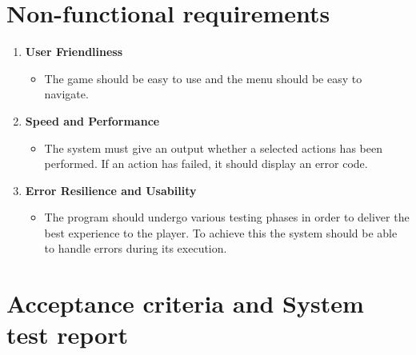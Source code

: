 \documentclass{article}
\begin{document}
\section{Non-functional requirements}

\begin{enumerate}
      \item \textbf{User Friendliness}
\begin{itemize}
    \item The game should be easy to use and the menu should be easy to navigate.
\end{itemize}

    \item \textbf{Speed and Performance}
\begin{itemize}
    \item The system must give an output whether a selected actions has been performed. If an action has failed, it should display an error code.
\end{itemize}

    \item \textbf{Error Resilience and Usability}
\begin{itemize}
    \item The program should undergo various testing phases in order to deliver the best experience to the player. To achieve this the system should be able to handle errors during its execution.
\end{itemize}
\end{enumerate}


\section{Acceptance criteria and System test report}
\end{document}
